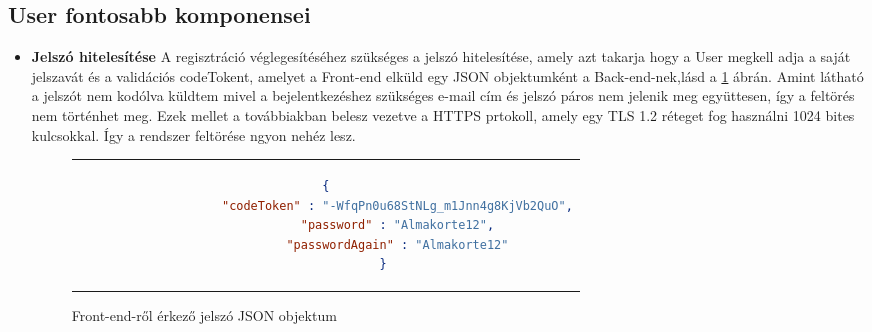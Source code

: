 \subsection{User fontosabb komponensei}
\begin{itemize}
	\item \textbf{Jelszó hitelesítése}
A regisztráció véglegesítéséhez szükséges a jelszó hitelesítése, amely azt takarja hogy a User megkell adja a saját jelszavát és a validációs codeTokent, amelyet a Front-end elküld egy JSON objektumként a Back-end-nek,lásd a \ref{passJSON} ábrán. Amint látható a jelszót nem kodólva küldtem mivel a bejelentkezéshez szükséges e-mail cím és jelszó páros nem jelenik meg együttesen, így a feltörés nem történhet meg. Ezek mellet a továbbiakban belesz vezetve a HTTPS prtokoll, amely egy TLS 1.2 réteget fog használni 1024 bites kulcsokkal. Így a rendszer feltörése ngyon nehéz lesz.
	\begin{figure}[thp]
		\centering
		\caption{Front-end-ről érkező jelszó JSON objektum}
		\label{passJSON}
		\begin{tabular}{c}
			\begin{lstlisting}[language=JSON]
				{
					"codeToken" : "-WfqPn0u68StNLg_m1Jnn4g8KjVb2QuO",
					"password" : "Almakorte12",
					"passwordAgain" : "Almakorte12"
				}
			\end{lstlisting}
		\end{tabular}
	\end{figure}
	

\end{itemize}
